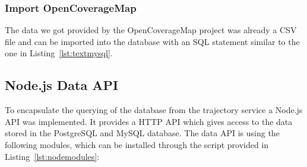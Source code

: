 \documentclass[master,english]{hgbthesis}
\begin{document}
\subsubsection{Import OpenCoverageMap}

The data we got provided by the OpenCoverageMap project was already a CSV file and can be imported into the database with an SQL statement similar to the one in Listing~\ref{lst:textmysql}.










\subsection{Node.js Data API}

To encapsulate the querying of the database from the trajectory service a Node.js API was implemented. It provides a HTTP API which gives access to the data stored in the PostgreSQL and MySQL database. The data API is using the following modules, which can be installed through the script provided in Listing~\ref{lst:nodemodules}:
\end{document}
